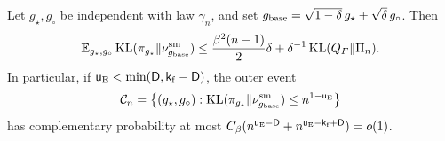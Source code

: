\begin{lemma}\label{u:lem:smoothing}
Let $g_\star,g_\circ$ be independent with law $\gamma_n$, and set
$g_{\rm base}=\sqrt{1-\delta}\,g_\star+\sqrt\delta\,g_\circ$. Then
\begin{equation}\label{u:eq:reverse-entropy}
 \mathbb E_{g_\star,g_\circ}\operatorname{KL}(\pi_{g_\star}\Vert\nu^{\rm sm}_{g_{\rm base}})
 \le\frac{\beta^2(n-1)}2\delta+\delta^{-1}\operatorname{KL}(Q_F\Vert\Pi_n).
\end{equation}
In particular, if $\mathsf{u}_{\rm E}<\min(\mathsf{D},\mathsf{k}_{\rm f}-\mathsf{D})$,
the outer event
\begin{equation}\label{u:eq:coverage-event}
 \mathcal C_n=\bigl\{(g_\star,g_\circ):
 \operatorname{KL}(\pi_{g_\star}\Vert\nu^{\rm sm}_{g_{\rm base}})
                         \le n^{1-\mathsf{u}_{\rm E}}\bigr\}
\end{equation}
has complementary probability at most
$C_\beta(n^{\mathsf{u}_{\rm E}-\mathsf{D}}+
 n^{\mathsf{u}_{\rm E}-\mathsf{k}_{\rm f}+\mathsf{D}})=o(1)$.
\end{lemma}

